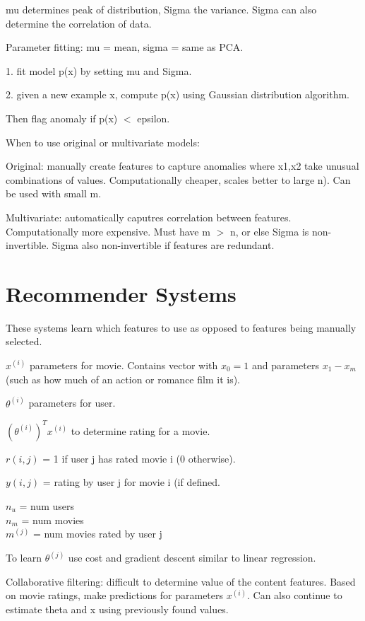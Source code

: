 \documentclass[12pt] {article}
\begin{document}
{  mu determines peak of distribution, Sigma the variance. Sigma can also
  determine the correlation of data.

  Parameter fitting: mu = mean, sigma = same as PCA. 

  1. fit model p(x) by setting mu and Sigma.

  2. given a new example x, compute p(x) using Gaussian distribution
  algorithm.

  Then flag anomaly if p(x) $<$ epsilon. 

  When to use original or multivariate models:

  Original: manually create features to capture anomalies where x1,x2 take
  unusual combinations of values. Computationally cheaper, scales better to
  large n). Can be used with small m. 

  Multivariate: automatically caputres correlation between features.
  Computationally more expensive. Must have m $>$ n, or else Sigma is 
  non-invertible. Sigma also non-invertible if features are redundant. 
  
  \newpage
  
\section{Recommender Systems}

  These systems learn which features to use as opposed to features being 
  manually selected. 
  
  $x^{(i)}$ parameters for movie. Contains vector with $x_0=1$ and parameters 
  $x_1-x_m$ (such as how much of an action or romance film it is). 

  $\theta^{(i)}$ parameters for user.
  
  $(\theta^{(i)})^T x^{(i)}$ to determine rating for a movie. 
  
  $r(i,j)$ = 1 if user j has rated movie i (0 otherwise).
  
  $y(i,j)$ = rating by user j for movie i (if defined.
  
  $n_u$ = num users\\
  $n_m$ = num movies\\
  $m^{(j)}$ = num movies rated by user j

  To learn $\theta^{(j)}$ use cost and gradient descent similar to linear 
  regression.

  Collaborative filtering: difficult to determine value of the content
  features. Based on movie ratings, make predictions for parameters $x^{(i)}$. 
  Can also continue to estimate theta and x using previously found values. 
  
}
\end{document}
